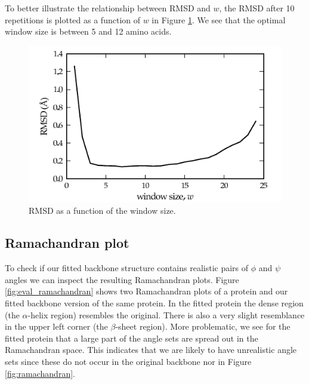 To better illustrate the relationship between RMSD and $w$, the RMSD after 10 repetitions is plotted as a function of $w$ in Figure \ref{fig:rmsd_windowsize}.
We see that the optimal window size is between 5 and 12 amino acids.
\begin{figure}
	\centering
	\hspace*{-3.5mm}\includegraphics[width=1.1\columnwidth]{figures/plot_rmsd}
	\caption{RMSD as a function of the window size.}
	\label{fig:rmsd_windowsize}
\end{figure}



\subsection{Ramachandran plot}
To check if our fitted backbone structure contains realistic pairs of $\phi$ and $\psi$ angles we can inspect the resulting Ramachandran plots.
Figure \ref{fig:eval_ramachandran} shows two Ramachandran plots of a protein and our fitted backbone version of the same protein.
In the fitted protein the dense region (the $\alpha$-helix region) resembles the original.
There is also a very slight resemblance in the upper left corner (the $\beta$-sheet region).
More problematic, we see for the fitted protein that a large part of the angle sets are spread out in the Ramachandran space.
This indicates that we are likely to have unrealistic angle sets since these do not occur in the original backbone nor in Figure \ref{fig:ramachandran}.

